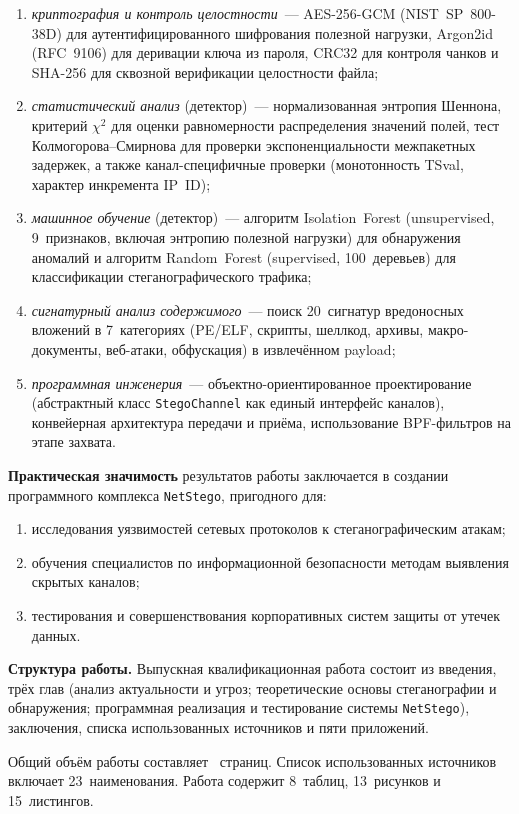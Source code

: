 \begin{enumerate}[label=\arabic*)]
  \item \textit{криптография и контроль целостности}~---
        AES-256-GCM (NIST~SP~800-38D) для аутентифицированного
        шифрования полезной нагрузки, Argon2id (RFC~9106) для
        деривации ключа из пароля, CRC32 для контроля чанков и
        SHA-256 для сквозной верификации целостности файла;
  \item \textit{статистический анализ} (детектор)~--- нормализованная
        энтропия Шеннона, критерий $\chi^2$ для оценки равномерности
        распределения значений полей, тест Колмогорова--Смирнова
        для проверки экспоненциальности межпакетных задержек, а
        также канал-специфичные проверки (монотонность TSval,
        характер инкремента IP~ID);
  \item \textit{машинное обучение} (детектор)~--- алгоритм
        Isolation~Forest (unsupervised, 9~признаков, включая энтропию
        полезной нагрузки) для обнаружения аномалий и алгоритм
        Random~Forest (supervised, 100~деревьев) для классификации
        стеганографического трафика;
  \item \textit{сигнатурный анализ содержимого}~--- поиск
        20~сигнатур вредоносных вложений в 7~категориях (PE/ELF,
        скрипты, шеллкод, архивы, макро-документы, веб-атаки,
        обфускация) в извлечённом payload;
  \item \textit{программная инженерия}~--- объектно-ориентированное
        проектирование (абстрактный класс \texttt{StegoChannel} как
        единый интерфейс каналов), конвейерная архитектура передачи
        и приёма, использование BPF-фильтров на этапе захвата.
\end{enumerate}

\textbf{Практическая значимость} результатов работы заключается
в создании программного комплекса \texttt{NetStego}, пригодного для:
\begin{enumerate}[label=\arabic*)]
  \item исследования уязвимостей сетевых протоколов к
        стеганографическим атакам;
  \item обучения специалистов по информационной безопасности
        методам выявления скрытых каналов;
  \item тестирования и совершенствования корпоративных систем
        защиты от утечек данных.
\end{enumerate}

\textbf{Структура работы.} Выпускная квалификационная работа состоит
из введения, трёх глав (анализ актуальности и угроз; теоретические
основы стеганографии и обнаружения; программная реализация и
тестирование системы \texttt{NetStego}), заключения, списка
использованных источников и пяти приложений.

Общий объём работы составляет \pageref{LastPage}~страниц.
Список использованных источников включает 23~наименования.
Работа содержит 8~таблиц, 13~рисунков и 15~листингов.

